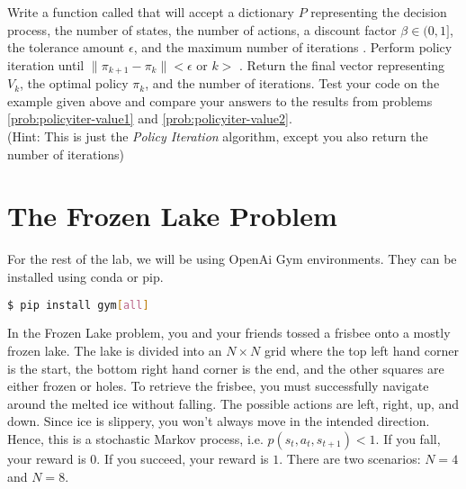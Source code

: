 \begin{problem}
\label{prob:policyiter-value4}
Write a function called  that will accept a dictionary $P$ representing the decision process, the number of states, the number of actions, a discount factor $\beta \in (0,1]$, the tolerance amount $\epsilon$, and the maximum number of iterations .
Perform policy iteration until $\|\pi_{k+1} - \pi_{k}\| < \epsilon$ or $k > $ .
Return the final vector representing $V_k$, the optimal policy $\pi_k$, and the number of iterations.
Test your code on the example given above and compare your answers to the results from problems \ref{prob:policyiter-value1} and \ref{prob:policyiter-value2}.
\\(Hint: This is just the \emph{Policy Iteration} algorithm, except you also return the number of iterations)
\end{problem}



\section*{The Frozen Lake Problem}
For the rest of the lab, we will be using OpenAi Gym environments.
They can be installed using conda or pip.
\begin{lstlisting}[language=Bash]
$ pip install gym[all]
\end{lstlisting}

In the Frozen Lake problem, you and your friends tossed a frisbee onto a mostly frozen lake.
The lake is divided into an $N \times N$ grid where the top left hand corner is the start, the bottom right hand corner is the end, and the other squares are either frozen or holes.
To retrieve the frisbee, you must successfully navigate around the melted ice without falling.
The possible actions are left, right, up, and down.
Since ice is slippery, you won't always move in the intended direction.
Hence, this is a stochastic Markov process, i.e. $p(s_t,a_t,s_{t+1})<1$.
If you fall, your reward is $0$.
If you succeed, your reward is $1$.
There are two scenarios: $N=4$ and $N=8$.

